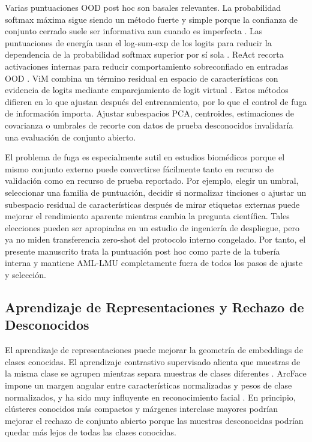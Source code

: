 \documentclass[11pt]{article}
\begin{document}
Varias puntuaciones OOD post hoc son basales relevantes. La probabilidad softmax máxima sigue siendo un método fuerte y simple porque la confianza de conjunto cerrado suele ser informativa aun cuando es imperfecta \cite{hendrycks2017_msp}. Las puntuaciones de energía usan el log-sum-exp de los logits para reducir la dependencia de la probabilidad softmax superior por sí sola \cite{liu2020_energy}. ReAct recorta activaciones internas para reducir comportamiento sobreconfiado en entradas OOD \cite{sun2021_react}. ViM combina un término residual en espacio de características con evidencia de logits mediante emparejamiento de logit virtual \cite{wang2022_vim}. Estos métodos difieren en lo que ajustan después del entrenamiento, por lo que el control de fuga de información importa. Ajustar subespacios PCA, centroides, estimaciones de covarianza o umbrales de recorte con datos de prueba desconocidos invalidaría una evaluación de conjunto abierto.

El problema de fuga es especialmente sutil en estudios biomédicos porque el mismo conjunto externo puede convertirse fácilmente tanto en recurso de validación como en recurso de prueba reportado. Por ejemplo, elegir un umbral, seleccionar una familia de puntuación, decidir si normalizar tinciones o ajustar un subespacio residual de características después de mirar etiquetas externas puede mejorar el rendimiento aparente mientras cambia la pregunta científica. Tales elecciones pueden ser apropiadas en un estudio de ingeniería de despliegue, pero ya no miden transferencia zero-shot del protocolo interno congelado. Por tanto, el presente manuscrito trata la puntuación post hoc como parte de la tubería interna y mantiene AML-LMU completamente fuera de todos los pasos de ajuste y selección.

\subsection{Aprendizaje de Representaciones y Rechazo de Desconocidos}

El aprendizaje de representaciones puede mejorar la geometría de embeddings de clases conocidas. El aprendizaje contrastivo supervisado alienta que muestras de la misma clase se agrupen mientras separa muestras de clases diferentes \cite{khosla2020_supcon}. ArcFace impone un margen angular entre características normalizadas y pesos de clase normalizados, y ha sido muy influyente en reconocimiento facial \cite{deng2019_arcface}. En principio, clústeres conocidos más compactos y márgenes interclase mayores podrían mejorar el rechazo de conjunto abierto porque las muestras desconocidas podrían quedar más lejos de todas las clases conocidas.
\end{document}
